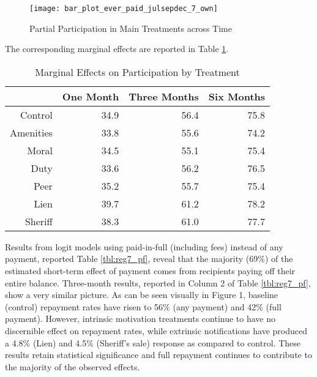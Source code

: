 \documentclass[12pt,titlepage]{article}
\begin{document}
\begin{figure}[htpb]
\begin{center}
\caption{Partial Participation in Main Treatments across Time}
\label{fig:ep_time_7_own}
\bigskip
\texttt{[image: bar\_plot\_ever\_paid\_julsepdec\_7\_own]}
\end{center}
\end{figure}


The corresponding marginal effects are reported in Table \ref{tbl:marg}.

\begin{table}[ht]
\centering
\caption{Marginal Effects on Participation by Treatment} 
\label{tbl:marg}
\begin{tabular}{rrrr}
  \hline
 & One Month & Three Months & Six Months \\ 
  \hline
Control & 34.9 & 56.4 & 75.8 \\ 
  Amenities & 33.8 & 55.6 & 74.2 \\ 
  Moral & 34.5 & 55.1 & 75.4 \\ 
  Duty & 33.6 & 56.2 & 76.5 \\ 
  Peer & 35.2 & 55.7 & 75.4 \\ 
  Lien & 39.7 & 61.2 & 78.2 \\ 
  Sheriff & 38.3 & 61.0 & 77.7 \\ 
   \hline
\end{tabular}
\end{table}

Results from logit models using 
paid-in-full (including fees) instead of any payment, reported Table 
\ref{tbl:reg7_pf}, reveal that the majority (69\%) of the estimated 
short-term effect of payment comes from recipients paying off their entire balance.
Three-month results, reported in Column 2 of Table \ref{tbl:reg7_pf}, show a very 
similar picture. As can be seen visually in Figure 1, baseline (control) 
repayment rates have risen to 56\% (any payment) and 42\% (full payment). 
However, intrinsic motivation treatments continue to have no discernible 
effect on repayment rates, while extrinsic notifications have produced a 
4.8\% (Lien) and 4.5\% (Sheriff's sale) response as compared to control. These 
results retain statistical significance and full repayment continues to 
contribute to the majority of the observed effects.
\end{document}
